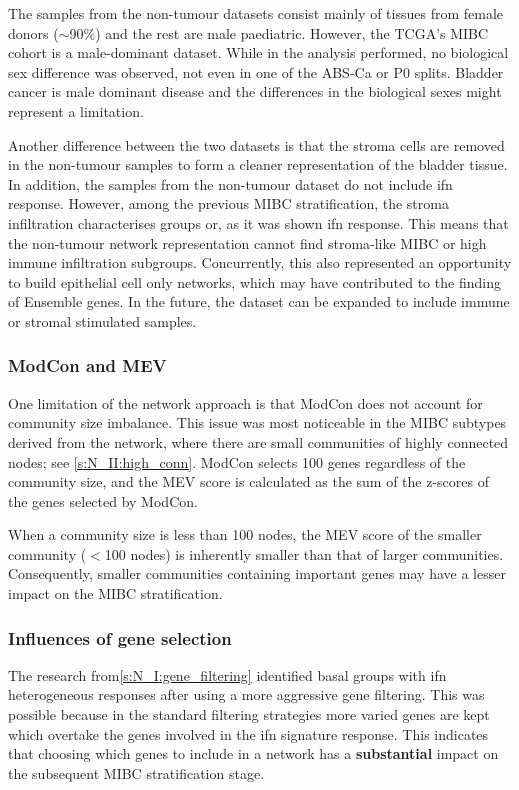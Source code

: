 The samples from the non-tumour datasets consist mainly of tissues from female donors (\(\sim\)90\%) and the rest are male paediatric. However, the TCGA's MIBC cohort is a male-dominant dataset. While in the analysis performed, no biological sex difference was observed, not even in one of the ABS-Ca or P0 splits. Bladder cancer is male dominant disease and the differences in the biological sexes might represent a limitation.

Another difference between the two datasets is that the stroma cells are removed in the non-tumour samples to form a cleaner representation of the bladder tissue. In addition, the samples from the non-tumour dataset do not include \acrlong{ifn} response. However, among the previous MIBC stratification, the stroma infiltration characterises groups or, as it was shown \acrshort{ifn} response. This means that the non-tumour network representation cannot find stroma-like MIBC or high immune infiltration subgroups. Concurrently, this also represented an opportunity to build epithelial cell only networks, which may have contributed to the finding of Ensemble genes. In the future, the dataset can be expanded to include immune or stromal stimulated samples.

\subsubsection*{ModCon and MEV}

One limitation of the network approach is that ModCon does not account for community size imbalance. This issue was most noticeable in the MIBC subtypes derived from the network, where there are small communities of highly connected nodes; see \cref{s:N_II:high_conn}. ModCon selects 100 genes regardless of the community size, and the MEV score is calculated as the sum of the z-scores of the genes selected by ModCon.

When a community size is less than 100 nodes, the MEV score of the smaller community (\(<\)100 nodes) is inherently smaller than that of larger communities. Consequently, smaller communities containing important genes may have a lesser impact on the MIBC stratification.


\subsubsection*{Influences of gene selection}

The research from\cref{s:N_I:gene_filtering} identified basal groups with \acrshort{ifn} heterogeneous responses after using a more aggressive gene filtering. This was possible because in the standard filtering strategies more varied genes are kept which overtake the genes involved in the \acrshort{ifn} signature response. This indicates that choosing which genes to include in a network has a \textbf{substantial} impact on the subsequent MIBC stratification stage. 

